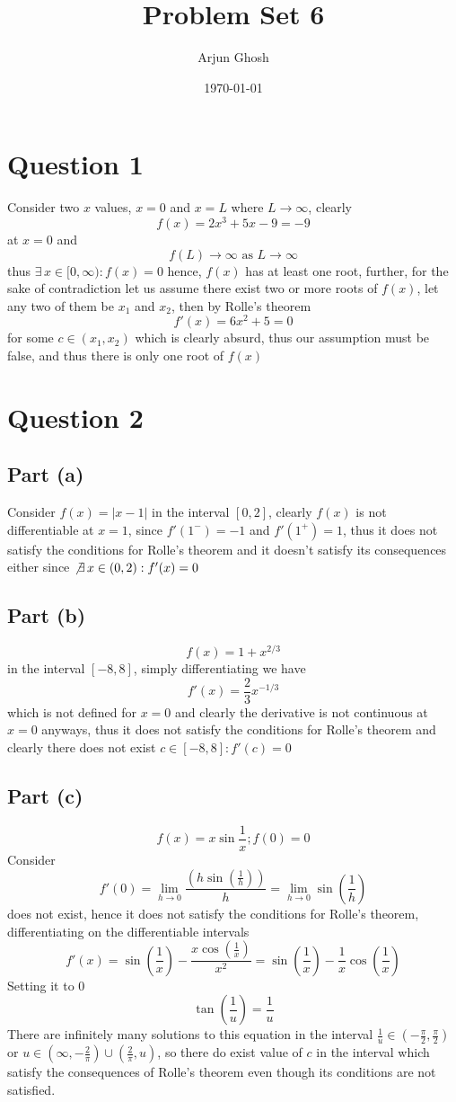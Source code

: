 \documentclass[12pt]{article}
\title{Problem Set 6}
\author{Arjun Ghosh}
\date{\today}
\begin{document}
\maketitle
\section{Question 1}
Consider two $x$ values, $x=0$ and $x = L$ where $L \to \infty$, clearly
$$
f(x) = 2x^{3} + 5x -9  = -9
$$ at $x=0$ and 
$$
f(L) \to \infty \text{ as } L \to \infty
$$
thus $\exists \,x \in [0,\infty) :f(x) = 0$ hence, $f(x)$ has at least one root, further, for the sake of contradiction let us assume there exist two or more roots of $f(x)$, let any two of them be $x_{1}$ and $x_{2}$, then by Rolle's theorem
$$
f'(x) = 6x^{2} + 5 = 0
$$
for some $c \in (x_{1}, x_{2})$ which is clearly absurd, thus our assumption must be false, and thus there is only one root of $f(x)$

\section{Question 2}
\subsection{Part (a)}
Consider $f(x) = |x-1|$ in the interval $[0,2]$, clearly $f(x)$ is not differentiable at $x=1$, since $f'(1^{-}) = -1$ and $f'(1^{+})=1$, thus it does not satisfy the conditions for Rolle's theorem and it doesn't satisfy its consequences either since $\not\exists \, x \in (0,2) : f'(x) = 0$

\subsection{Part (b)}
$$
f(x) = 1 + x^{2/3}
$$
in the interval $[-8,8]$, simply differentiating we have
$$
f'(x) = \frac{2}{3}x^{-1/3}
$$
which is not defined for $x=0$ and clearly the derivative is not continuous at $x=0$ anyways, thus it does not satisfy the conditions for Rolle's theorem and clearly there does not exist $c \in[-8,8]: f'(c) = 0$

\subsection{Part (c)}
$$
f(x) = x \sin \frac{1}{x}; f(0) = 0
$$
Consider
$$
f'(0) = \lim_{ h \to 0 } \frac{\left( h\sin\left( \frac{1}{h} \right)  \right)}{h} = \lim_{  h \to 0 } \sin\left( \frac{1}{h} \right)
$$
does not exist, hence it does not satisfy the conditions for Rolle's theorem, differentiating on the differentiable intervals
$$
f'(x) = \sin\left( \frac{1}{x} \right) - \frac{x\cos\left( \frac{1}{x} \right)}{x^{2}} = \sin\left( \frac{1}{x} \right) -\frac{1}{x}\cos\left( \frac{1}{x} \right)
$$
Setting it to $0$
$$
\tan\left( \frac{1}{u} \right) = \frac{1}{u}
$$
There are infinitely many solutions to this equation in the interval $\frac{1}{u} \in\left( -\frac{\pi}{2}, \frac{\pi}{2} \right)$ or $u \in \left( \infty, -\frac{2}{\pi} \right) \cup\left( \frac{2}{\pi}, u \right)$, so there do exist value of $c$ in the interval which satisfy the consequences of Rolle's theorem even though its conditions are not satisfied.
\end{document}
